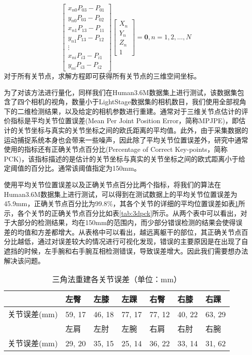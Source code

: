\begin{equation}
    \left[ \begin{array}{c}
            x_{n0}P_{03} - P_{01} \\
            y_{n0}P_{03} - P_{02} \\
            x_{n1}P_{13} - P_{11} \\
            y_{n1}P_{13} - P_{12} \\
            \vdots                \\
            x_{ni}P_{i3} - P_{i1} \\
            y_{ni}P_{i3} - P_{i2}
        \end{array}\right] \left[ \begin{array}{c}
            X_n \\
            Y_n \\
            Z_n \\
            1
        \end{array}\right]  = \bm{0}, n = 1,2,\ldots,N
\end{equation}
对于所有关节点，求解方程即可获得所有关节点的三维空间坐标。

为了对该方法进行量化，同样我们在Human3.6M数据集上进行测试，该数据集包含了四个相机的视角，数量小于LightStage数据集的相机数目，我们使用全部视角下的二维检测结果，以及给定的相机参数进行重建。通常对于三维关节点估计的评价指标是平均关节位置误差(Mean Per Joint Position Error，简称MPJPE)，即估计的关节坐标与真实的关节坐标之间的欧氏距离的平均值。此外，由于采集数据的运动捕捉系统本身也会带来一些噪声，因此除了平均关节位置误差外，研究中通常使用的指标还有正确关节点百分比(Percentage of Correct Key-points，简称PCK)，该指标描述的是估计的关节坐标与真实的关节坐标之间的欧式距离小于给定阈值的百分比。通常该阈值指定为150mm。

使用平均关节位置误差以及正确关节点百分比两个指标，将我们的算法在Human3.6M数据集上进行测试，可以得到在测试数据上的平均关节位置误差为45.9mm，正确关节点百分比为99.8\%，其各个关节的详细的平均位置误差如表\ref{tab:3derrorjoint}所示，各个关节的正确关节点百分比如表\ref{tab:3dpck}所示。从两个表中可以看出，对于大部分的检测结果，均在150mm的范围内，而少部分错误检测的结果会使得误差的均值和方差都增大。从表格中可以看出，越远离躯干的部位，其正确关节点百分比越低，通过对误差较大的情况进行可视化发现，错误的主要原因是在出现了自遮挡的时候，左手腕和右手腕互相检测错误，导致误差增大。因此我们需要想办法解决该问题。

\begin{table}[H]
    \centering
    \begin{tabular}{lllllll}
        \hline
                     & 左臀  & 左膝  & 左踝  & 右臀  & 右膝  & 右踝  \\
        \hline
        关节误差(mm) & 59, 17 & 46, 18 & 77, 17 & 77, 12 & 40, 22 & 63, 29 \\
                     & 左肩  & 左肘  & 左腕  & 右肩  & 右肘  & 右腕  \\
        关节误差(mm) & 29, 20 & 35, 15 & 25, 14 & 36, 22 & 33, 14 & 31, 62 \\
        \hline
    \end{tabular}
    \caption{三角法重建各关节误差（单位：mm）\label{tab:3derrorjoint}}
\end{table}

